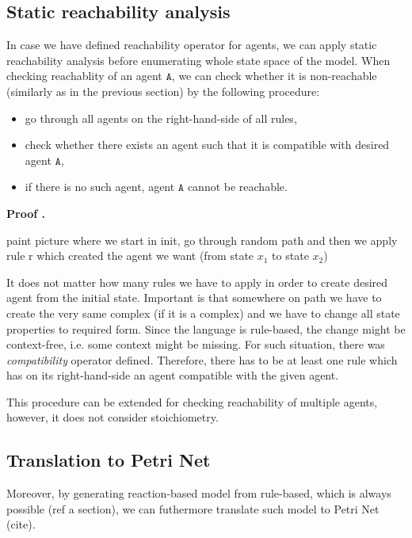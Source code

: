 \documentclass[12pt]{fithesis2}
\newcounter{counter}[section]
\renewcommand{\thecounter}{\thesection.\arabic{counter}}
\newenvironment{proof}{\bigskip\refstepcounter{counter}\noindent\textbf{Proof \thecounter}\par\nopagebreak}{\bigskip}
\begin{document}
\subsection{Static reachability analysis}

In case we have defined reachability operator for agents, we can apply static reachability analysis before enumerating whole state space of the model. When checking reachablity of an agent $\mathtt{A}$, we can check whether it is non-reachable (similarly as in the previous section) by the following procedure:

\begin{itemize}
\item go through all agents on the right-hand-side of all rules,
\item check whether there exists an agent such that it is compatible with desired agent $\mathtt{A}$,
\item if there is no such agent, agent $\mathtt{A}$ cannot be reachable.
\end{itemize}

\begin{proof}
{paint picture where we start in init, go through random path and then we apply rule r which created the agent we want (from state $x_1$ to state $x_2$)

It does not matter how many rules we have to apply in order to create desired agent from the initial state. Important is that somewhere on path we have to create the very same complex (if it is a complex) and we have to change all state properties to required form. Since the language is rule-based, the change might be context-free, i.e. some context might be missing. For such situation, there was \emph{compatibility} operator defined. Therefore, there has to be at least one rule which has on its right-hand-side an agent compatible with the given agent.}
\end{proof}

This procedure can be extended for checking reachability of multiple agents, however, it does not consider stoichiometry.

\subsection{Translation to Petri Net}

Moreover, by generating reaction-based model from rule-based, which is always possible (ref a section), we can futhermore translate such model to Petri Net (cite).
\end{document}
